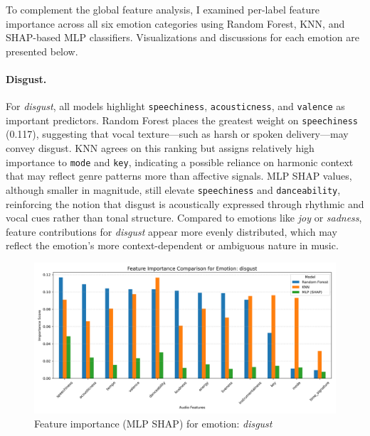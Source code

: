 \documentclass{article}
\begin{document}
To complement the global feature analysis, I examined per-label feature importance across all six emotion categories using Random Forest, KNN, and SHAP-based MLP classifiers. Visualizations and discussions for each emotion are presented below.

\paragraph{Disgust.} For \textit{disgust}, all models highlight \texttt{speechiness}, \texttt{acousticness}, and \texttt{valence} as important predictors. Random Forest places the greatest weight on \texttt{speechiness} (0.117), suggesting that vocal texture—such as harsh or spoken delivery—may convey disgust. KNN agrees on this ranking but assigns relatively high importance to \texttt{mode} and \texttt{key}, indicating a possible reliance on harmonic context that may reflect genre patterns more than affective signals. MLP SHAP values, although smaller in magnitude, still elevate \texttt{speechiness} and \texttt{danceability}, reinforcing the notion that disgust is acoustically expressed through rhythmic and vocal cues rather than tonal structure. Compared to emotions like \textit{joy} or \textit{sadness}, feature contributions for \textit{disgust} appear more evenly distributed, which may reflect the emotion’s more context-dependent or ambiguous nature in music.

\begin{figure}[H]
\centering
\includegraphics[width=\linewidth]{Graphics/per_label/disgust_feature_importance.png}
\caption{Feature importance (MLP SHAP) for emotion: \textit{disgust}}
\label{fig:shap_disgust}
\end{figure}
\end{document}
